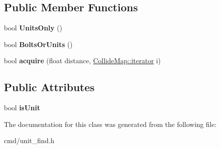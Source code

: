 \subsection*{Public Member Functions}
\begin{DoxyCompactItemize}
\item 
bool {\bfseries Units\+Only} ()\hypertarget{classNearestObjectLocator_ab0e7f28f99dd0738311d04584d762375}{}\label{classNearestObjectLocator_ab0e7f28f99dd0738311d04584d762375}

\item 
bool {\bfseries Bolts\+Or\+Units} ()\hypertarget{classNearestObjectLocator_a2a6e333063c574a1403047d428ac51ed}{}\label{classNearestObjectLocator_a2a6e333063c574a1403047d428ac51ed}

\item 
bool {\bfseries acquire} (float distance, \hyperlink{classCollidable}{Collide\+Map\+::iterator} i)\hypertarget{classNearestObjectLocator_a5336384c1757e531e07fa0892079480b}{}\label{classNearestObjectLocator_a5336384c1757e531e07fa0892079480b}

\end{DoxyCompactItemize}
\subsection*{Public Attributes}
\begin{DoxyCompactItemize}
\item 
bool {\bfseries is\+Unit}\hypertarget{classNearestObjectLocator_ab624d8c46b028b82d4cbd1b0c23e441f}{}\label{classNearestObjectLocator_ab624d8c46b028b82d4cbd1b0c23e441f}

\end{DoxyCompactItemize}


The documentation for this class was generated from the following file\+:\begin{DoxyCompactItemize}
\item 
cmd/unit\+\_\+find.\+h\end{DoxyCompactItemize}
